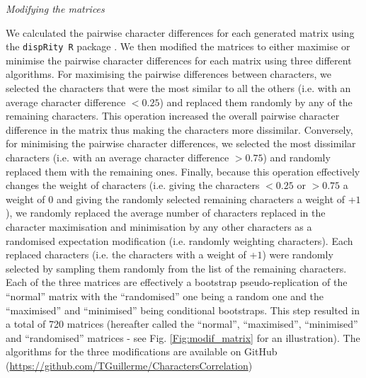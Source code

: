 \documentclass[12pt,letterpaper]{article}
\renewcommand{\subsection}[1]{%
\bigskip
\begin{center}
\begin{large}
\normalfont\itshape #1
\end{large}
\end{center}}
\begin{document}
\subsection{Modifying the matrices}
We calculated the pairwise character differences for each generated matrix using the \texttt{dispRity R} package \citep{thomas_guillerme_2016_55646}.
We then modified the matrices to either maximise or minimise the pairwise character differences for each matrix using three different algorithms.
For maximising the pairwise differences between characters, we selected the characters that were the most similar to all the others (i.e. with an average character difference $<0.25$) and replaced them randomly by any of the remaining characters.
This operation increased the overall pairwise character difference in the matrix thus making the characters more dissimilar.
Conversely, for minimising the pairwise character differences, we selected the most dissimilar characters (i.e. with an average character difference $>0.75$) and randomly replaced them with the remaining ones.
Finally, because this operation effectively changes the weight of characters (i.e. giving the characters $<0.25$ or $>0.75$ a weight of $0$ and giving the randomly selected remaining characters a weight of +$1$), we randomly replaced the average number of characters replaced in the character maximisation and minimisation by any other characters as a randomised expectation modification (i.e. randomly weighting characters).
Each replaced characters (i.e. the characters with a weight of +$1$) were randomly selected by sampling them randomly from the list of the remaining characters.
Each of the three matrices are effectively a bootstrap pseudo-replication of the ``normal'' matrix with the ``randomised'' one being a random one and the ``maximised'' and ``minimised'' being conditional bootstraps.
This step resulted in a total of 720 matrices (hereafter called the ``normal'', ``maximised'', ``minimised'' and ``randomised'' matrices - see Fig. \ref{Fig:modif_matrix} for an illustration).
The algorithms for the three modifications are available on GitHub (\url{https://github.com/TGuillerme/CharactersCorrelation})
\end{document}
